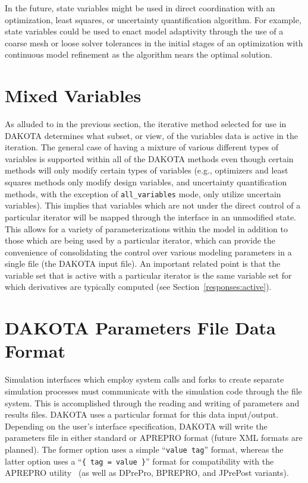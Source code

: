In the future, state variables might be used in direct coordination
with an optimization, least squares, or uncertainty quantification
algorithm. For example, state variables could be used to enact model
adaptivity through the use of a coarse mesh or loose solver tolerances
in the initial stages of an optimization with continuous model
refinement as the algorithm nears the optimal solution.

\section{Mixed Variables}\label{variables:mixed}

As alluded to in the previous section, the iterative method selected
for use in DAKOTA determines what subset, or view, of the variables
data is active in the iteration. The general case of having a mixture
of various different types of variables is supported within all of the
DAKOTA methods even though certain methods will only modify certain
types of variables (e.g., optimizers and least squares methods only
modify design variables, and uncertainty quantification methods, with
the exception of \texttt{all\_variables} mode, only utilize uncertain
variables).  This implies that variables which are not under the
direct control of a particular iterator will be mapped through the
interface in an unmodified state. This allows for a variety of
parameterizations within the model in addition to those which are
being used by a particular iterator, which can provide the convenience
of consolidating the control over various modeling parameters in a
single file (the DAKOTA input file). An important related point is
that the variable set that is active with a particular iterator is the
same variable set for which derivatives are typically computed (see
Section~\ref{responses:active}).

\section{DAKOTA Parameters File Data Format}\label{variables:parameters}

Simulation interfaces which employ system calls and forks to create
separate simulation processes must communicate with the simulation
code through the file system. This is accomplished through the reading
and writing of parameters and results files. DAKOTA uses a particular
format for this data input/output. Depending on the user's interface
specification, DAKOTA will write the parameters file in either
standard or APREPRO format (future XML formats are planned). The
former option uses a simple ``\texttt{value tag}'' format, whereas the
latter option uses a ``\texttt{\{ tag = value \}}'' format for
compatibility with the APREPRO utility~\cite{Sja92} (as well as
DPrePro, BPREPRO, and JPrePost variants).

